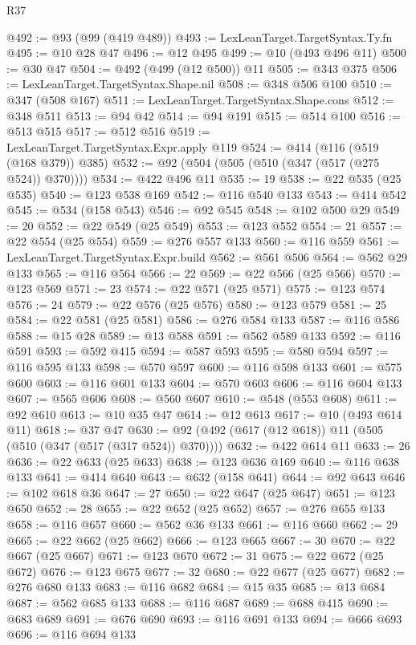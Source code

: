 \begin{lexlean}{R37}
\begin{coremodule}
@492 := @93 (@99 (@419 @489))
@493 := LexLeanTarget.TargetSyntax.Ty.fn
@495 := @10 @28 @47
@496 := @12 @495
@499 := @10 (@493 @496 @11)
@500 := @30 @47
@504 := @492 (@499 (@12 @500)) @11
@505 := @343 @375
@506 := LexLeanTarget.TargetSyntax.Shape.nil
@508 := @348 @506 @100
@510 := @347 (@508 @167)
@511 := LexLeanTarget.TargetSyntax.Shape.cons
@512 := @348 @511
@513 := @94 @42
@514 := @94 @191
@515 := @514 @100
@516 := @513 @515
@517 := @512 @516
@519 := LexLeanTarget.TargetSyntax.Expr.apply @119
@524 := @414 (@116 (@519 (@168 @379)) @385)
@532 := @92 (@504 (@505 (@510 (@347 (@517 (@275 @524)) @370))))
@534 := @422 @496 @11
@535 := 19
@538 := @22 @535 (@25 @535)
@540 := @123 @538 @169
@542 := @116 @540 @133
@543 := @414 @542
@545 := @534 (@158 @543)
@546 := @92 @545
@548 := @102 @500 @29
@549 := 20
@552 := @22 @549 (@25 @549)
@553 := @123 @552
@554 := 21
@557 := @22 @554 (@25 @554)
@559 := @276 @557 @133
@560 := @116 @559
@561 := LexLeanTarget.TargetSyntax.Expr.build
@562 := @561 @506
@564 := @562 @29 @133
@565 := @116 @564
@566 := 22
@569 := @22 @566 (@25 @566)
@570 := @123 @569
@571 := 23
@574 := @22 @571 (@25 @571)
@575 := @123 @574
@576 := 24
@579 := @22 @576 (@25 @576)
@580 := @123 @579
@581 := 25
@584 := @22 @581 (@25 @581)
@586 := @276 @584 @133
@587 := @116 @586
@588 := @15 @28
@589 := @13 @588
@591 := @562 @589 @133
@592 := @116 @591
@593 := @592 @415
@594 := @587 @593
@595 := @580 @594
@597 := @116 @595 @133
@598 := @570 @597
@600 := @116 @598 @133
@601 := @575 @600
@603 := @116 @601 @133
@604 := @570 @603
@606 := @116 @604 @133
@607 := @565 @606
@608 := @560 @607
@610 := @548 (@553 @608)
@611 := @92 @610
@613 := @10 @35 @47
@614 := @12 @613
@617 := @10 (@493 @614 @11)
@618 := @37 @47
@630 := @92 (@492 (@617 (@12 @618)) @11 (@505 (@510 (@347 (@517 (@317 @524)) @370))))
@632 := @422 @614 @11
@633 := 26
@636 := @22 @633 (@25 @633)
@638 := @123 @636 @169
@640 := @116 @638 @133
@641 := @414 @640
@643 := @632 (@158 @641)
@644 := @92 @643
@646 := @102 @618 @36
@647 := 27
@650 := @22 @647 (@25 @647)
@651 := @123 @650
@652 := 28
@655 := @22 @652 (@25 @652)
@657 := @276 @655 @133
@658 := @116 @657
@660 := @562 @36 @133
@661 := @116 @660
@662 := 29
@665 := @22 @662 (@25 @662)
@666 := @123 @665
@667 := 30
@670 := @22 @667 (@25 @667)
@671 := @123 @670
@672 := 31
@675 := @22 @672 (@25 @672)
@676 := @123 @675
@677 := 32
@680 := @22 @677 (@25 @677)
@682 := @276 @680 @133
@683 := @116 @682
@684 := @15 @35
@685 := @13 @684
@687 := @562 @685 @133
@688 := @116 @687
@689 := @688 @415
@690 := @683 @689
@691 := @676 @690
@693 := @116 @691 @133
@694 := @666 @693
@696 := @116 @694 @133

\end{coremodule}
\end{lexlean}
